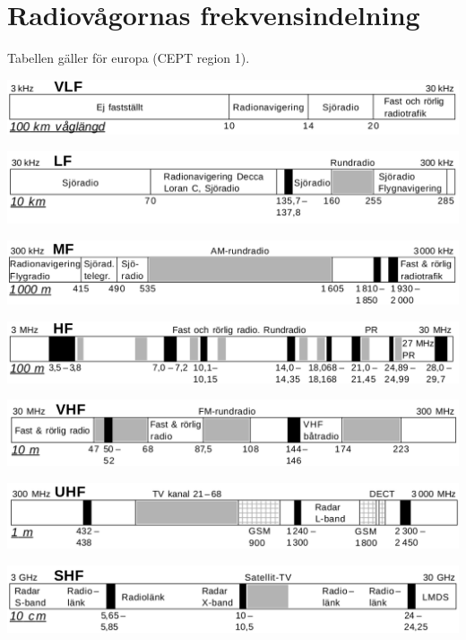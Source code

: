 \section{Radiovågornas frekvensindelning}

Tabellen gäller för europa (CEPT region 1).

\includegraphics[width=\columnwidth]{blabok/pictures/r6-1-vlf}

\includegraphics[width=\columnwidth]{blabok/pictures/r6-2-lf}

\includegraphics[width=\columnwidth]{blabok/pictures/r6-3-mf}

\includegraphics[width=\columnwidth]{blabok/pictures/r6-4-hf}

\includegraphics[width=\columnwidth]{blabok/pictures/r6-5-vhf}

\includegraphics[width=\columnwidth]{blabok/pictures/r6-6-uhf}

\includegraphics[width=\columnwidth]{blabok/pictures/r6-7-shf}

